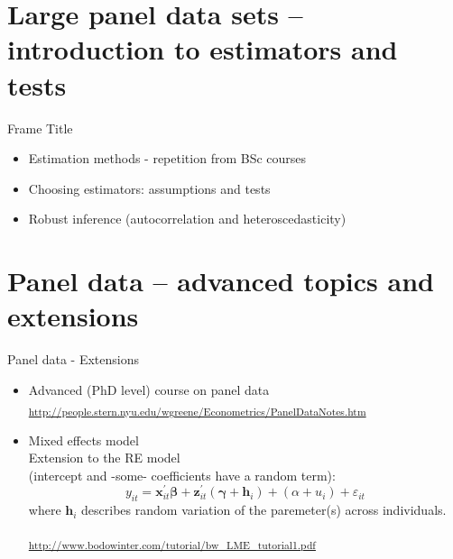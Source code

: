 \documentclass[usenames,dvipsnames]{beamer}
\begin{document}
\section{Large panel data sets -- introduction to estimators and tests}
\begin{frame}{Frame Title}
    \begin{itemize}
        \item Estimation methods - repetition from BSc courses
        \bigskip
        \item Choosing estimators: assumptions and tests
        \bigskip
        \item Robust inference (autocorrelation and heteroscedasticity)
    \end{itemize}
\end{frame}










\section{Panel data -- advanced topics and extensions}
\begin{frame}{Panel data - Extensions}
\begin{itemize}
\item Advanced (PhD level) course on panel data \\
\textsubscript{\textcolor{Blue}{\url{http://people.stern.nyu.edu/wgreene/Econometrics/PanelDataNotes.htm}} }
\bigskip
\item Mixed effects model \\
Extension to the RE model \\(intercept and -some- coefficients have a random term):
$$
y_{it}=\bm{x}_{it}^{\prime} \bm{\beta} + \bm{z}_{it}^{\prime}( \bm{\gamma} + \bm{h}_i) +
(\alpha + u_i) + \varepsilon_{it}
$$
where $\bm{h}_i$ describes random variation of the paremeter(s) across individuals.\\
\medskip

\textsubscript{ \textcolor{Blue}{\url{http://www.bodowinter.com/tutorial/bw_LME_tutorial1.pdf}} } \\
\end{itemize}
\end{frame}
\end{document}
